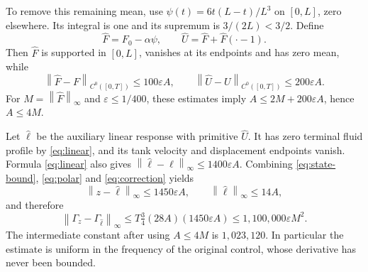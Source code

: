 \documentclass[11pt]{article}
\newcommand{\norm}[1]{\left\|#1\right\|}
\begin{document}
To remove this remaining mean, use
$\psi(t)=6t(L-t)/L^3$ on $[0,L]$, zero elsewhere. Its integral is one
and its supremum is $3/(2L)<3/2$. Define
\[
\widehat F=F_0-\alpha\psi,\qquad
\widehat U=\widehat F+\widehat F(\cdot-1).
\]
Then $\widehat F$ is supported in $[0,L]$, vanishes at its endpoints and
has zero mean, while
\begin{equation}\label{eq:correction}
\norm{\widehat F-F}_{C^0([0,T])}\le100\varepsilon A,\qquad
\norm{\widehat U-U}_{C^0([0,T])}\le200\varepsilon A.
\end{equation}
For $M=\norm{\widehat F}_\infty$ and $\varepsilon\le1/400$, these estimates
imply $A\le2M+200\varepsilon A$, hence $A\le4M$.

Let $\widehat\ell$ be the auxiliary linear response with primitive
$\widehat U$. It has zero terminal fluid profile by \eqref{eq:linear},
and its tank velocity and displacement endpoints vanish. Formula
\eqref{eq:linear} also gives
$\norm{\widehat\ell-\ell}_\infty\le1400\varepsilon A$. Combining
\eqref{eq:state-bound}, \eqref{eq:polar} and \eqref{eq:correction} yields
\[
\norm{z-\widehat\ell}_\infty\le1450\varepsilon A,
\qquad \norm{\widehat\ell}_\infty\le14A,
\]
and therefore
\begin{equation}\label{eq:error}
\norm{\Gamma_z-\Gamma_{\widehat\ell}}_\infty
\le T\tfrac34(28A)(1450\varepsilon A)
\le1{,}100{,}000\varepsilon M^2.
\end{equation}
The intermediate constant after using $A\le4M$ is $1{,}023{,}120$.
In particular the estimate is uniform in the frequency of the original
control, whose derivative has never been bounded.
\end{document}
